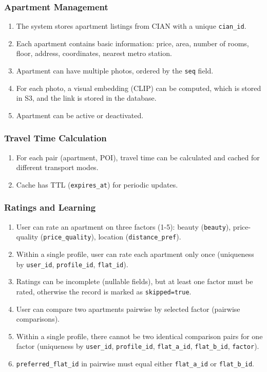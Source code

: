 \documentclass[12pt,a4paper]{article}
\begin{document}
\subsubsection{Apartment Management}
\begin{enumerate}
    \item The system stores apartment listings from CIAN with a unique \texttt{cian\_id}.
    \item Each apartment contains basic information: price, area, number of rooms, floor, address, coordinates, nearest metro station.
    \item Apartment can have multiple photos, ordered by the \texttt{seq} field.
    \item For each photo, a visual embedding (CLIP) can be computed, which is stored in S3, and the link is stored in the database.
    \item Apartment can be active or deactivated.
\end{enumerate}

\subsubsection{Travel Time Calculation}
\begin{enumerate}
    \item For each pair (apartment, POI), travel time can be calculated and cached for different transport modes.
    \item Cache has TTL (\texttt{expires\_at}) for periodic updates.
\end{enumerate}

\subsubsection{Ratings and Learning}
\begin{enumerate}
    \item User can rate an apartment on three factors (1-5): beauty (\texttt{beauty}), price-quality (\texttt{price\_quality}), location (\texttt{distance\_pref}).
    \item Within a single profile, user can rate each apartment only once (uniqueness by \texttt{user\_id}, \texttt{profile\_id}, \texttt{flat\_id}).
    \item Ratings can be incomplete (nullable fields), but at least one factor must be rated, otherwise the record is marked as \texttt{skipped=true}.
    \item User can compare two apartments pairwise by selected factor (pairwise comparisons).
    \item Within a single profile, there cannot be two identical comparison pairs for one factor (uniqueness by \texttt{user\_id}, \texttt{profile\_id}, \texttt{flat\_a\_id}, \texttt{flat\_b\_id}, \texttt{factor}).
    \item \texttt{preferred\_flat\_id} in pairwise must equal either \texttt{flat\_a\_id} or \texttt{flat\_b\_id}.
\end{enumerate}
\end{document}
